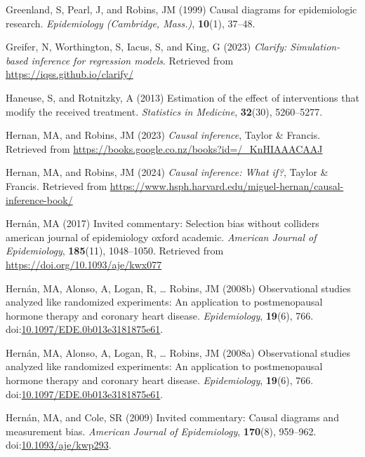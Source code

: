 \documentclass[
  single column]{article}
\newlength{\cslhangindent}
\newenvironment{CSLReferences}[2] %
 {\begin{list}{}{%
  \setlength{\itemindent}{0pt}
  \setlength{\leftmargin}{0pt}
  \setlength{\parsep}{0pt}
  \ifodd #1
   \setlength{\leftmargin}{\cslhangindent}
   \setlength{\itemindent}{-1\cslhangindent}
  \fi
  \setlength{\itemsep}{#2\baselineskip}}}
 {\end{list}}
\begin{document}
\begin{CSLReferences}{1}{0}
Greenland, S, Pearl, J, and Robins, JM (1999) Causal diagrams for
epidemiologic research. \emph{Epidemiology (Cambridge, Mass.)},
\textbf{10}(1), 37--48.

Greifer, N, Worthington, S, Iacus, S, and King, G (2023) \emph{Clarify:
Simulation-based inference for regression models}. Retrieved from
\url{https://iqss.github.io/clarify/}

Haneuse, S, and Rotnitzky, A (2013) Estimation of the effect of
interventions that modify the received treatment. \emph{Statistics in
Medicine}, \textbf{32}(30), 5260--5277.

Hernan, MA, and Robins, JM (2023) \emph{Causal inference}, Taylor \&
Francis. Retrieved from
\url{https://books.google.co.nz/books?id=/_KnHIAAACAAJ}

Hernan, MA, and Robins, JM (2024) \emph{Causal inference: What if?},
Taylor \& Francis. Retrieved from
\url{https://www.hsph.harvard.edu/miguel-hernan/causal-inference-book/}

Hernán, MA (2017) Invited commentary: Selection bias without colliders
\textbar{} american journal of epidemiology \textbar{} oxford academic.
\emph{American Journal of Epidemiology}, \textbf{185}(11), 1048--1050.
Retrieved from \url{https://doi.org/10.1093/aje/kwx077}

Hernán, MA, Alonso, A, Logan, R, \ldots{} Robins, JM (2008b)
Observational studies analyzed like randomized experiments: An
application to postmenopausal hormone therapy and coronary heart
disease. \emph{Epidemiology}, \textbf{19}(6), 766.
doi:\href{https://doi.org/10.1097/EDE.0b013e3181875e61}{10.1097/EDE.0b013e3181875e61}.

Hernán, MA, Alonso, A, Logan, R, \ldots{} Robins, JM (2008a)
Observational studies analyzed like randomized experiments: An
application to postmenopausal hormone therapy and coronary heart
disease. \emph{Epidemiology}, \textbf{19}(6), 766.
doi:\href{https://doi.org/10.1097/EDE.0b013e3181875e61}{10.1097/EDE.0b013e3181875e61}.

Hernán, MA, and Cole, SR (2009) Invited commentary: Causal diagrams and
measurement bias. \emph{American Journal of Epidemiology},
\textbf{170}(8), 959--962.
doi:\href{https://doi.org/10.1093/aje/kwp293}{10.1093/aje/kwp293}.


\end{CSLReferences}
\end{document}
